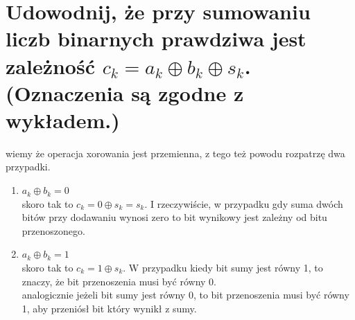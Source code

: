 \documentclass{article}
\begin{document}
\section{Udowodnij, że przy sumowaniu liczb binarnych prawdziwa jest zależność $c_k = a_k \oplus b_k \oplus s_k$. (Oznaczenia są zgodne z wykładem.)}
wiemy że operacja xorowania jest przemienna, z tego też powodu rozpatrzę dwa przypadki.
\begin{enumerate}
	\item $a_k \oplus b_k = 0$\\
	skoro tak to $c_k = 0 \oplus s_k = s_k$. I rzeczywiście, w przypadku gdy suma dwóch bitów przy dodawaniu wynosi zero to bit wynikowy jest zależny od bitu przenoszonego.
	\item $a_k \oplus b_k = 1$\\
	skoro tak to $c_k = 1 \oplus s_k $. W przypadku kiedy bit sumy jest równy 1, to znaczy, że bit przenoszenia musi być równy 0.\\
	analogicznie jeżeli bit sumy jest równy 0, to bit przenoszenia musi być równy 1, aby przeniósł bit który wynikł z sumy.

\end{enumerate}
\end{document}
